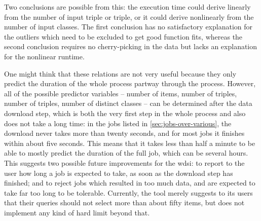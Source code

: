 Two conclusions are possible from this:
the execution time could derive linearly from the number of input \gls{triple} or  \gls{triple},
or it could derive nonlinearly from the number of input classes.
The first conclusion has no satisfactory explanation for the outliers
which need to be excluded to get good function fits,
whereas the second conclusion requires no cherry-picking in the data
but lacks an explanation for the nonlinear runtime.

One might think that these relations are not very useful
because they only predict the duration of the whole process partway through the process.
However, all of the possible predictor variables – %
number of \glspl{item}, number of \glspl{triple}, number of  \glspl{triple}, number of distinct classes –
can be determined after the data download step,
which is both the very first step in the whole process
and also does not take a long time:
in the jobs listed in \cref{sec:jobs-over-various},
the download never takes more than twenty seconds,
and for most jobs it finishes within about five seconds.
This means that it takes less than half a minute
to be able to mostly predict the duration of the full \gls{job}, which can be several hours.
This suggests two possible future improvements
for the \gls{wdsi}:
to report to the user how long a \gls{job} is expected to take,
as soon as the download step has finished;
and to reject \glspl{job} which resulted in too much data,
and are expected to take far too long to be tolerable.
Currently, the tool merely suggests to its users
that their queries should not select more than about fifty \glspl{item},
but does not implement any kind of hard limit beyond that.
